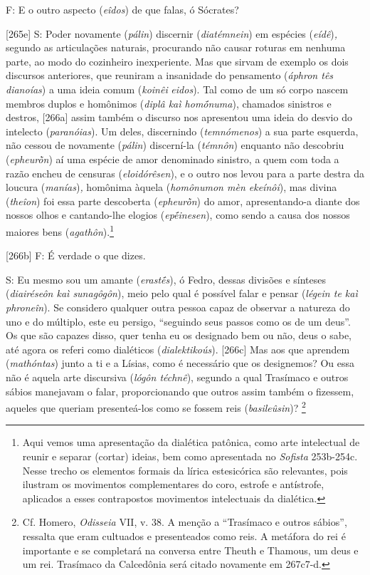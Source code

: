 F: E o outro aspecto (\emph{eîdos}) de que falas, ó Sócrates?

{[}265e{]} S: Poder novamente (\emph{pálin}) discernir
(\emph{diatémnein}) em espécies (\emph{eídê})\emph{,} segundo as
articulações naturais, procurando não causar roturas em nenhuma parte,
ao modo do cozinheiro inexperiente. Mas que sirvam de exemplo os dois
discursos anteriores, que reuniram a insanidade do pensamento
(\emph{áphron tês dianoías}) a uma ideia comum (\emph{koinêi}
\emph{eidos}). Tal como de um só corpo nascem membros duplos e homônimos
(\emph{diplâ kaì homṓnuma}), chamados sinistros e destros, {[}266a{]}
assim também o discurso nos apresentou uma ideia do desvio do intelecto
(\emph{paranóias}). Um deles, discernindo (\emph{temnómenos}) a sua
parte esquerda, não cessou de novamente (\emph{pálin}) discerní-la
(\emph{témnôn}) enquanto não descobriu (\emph{epheurṑn}) aí uma espécie
de amor denominado sinistro, a quem com toda a razão encheu de censuras
(\emph{eloidórêsen}), e o outro nos levou para a parte destra da loucura
(\emph{manías})\emph{,} homônima àquela (\emph{homônumon mèn ekeínôi}),
mas divina (\emph{theîon}) foi essa parte descoberta (\emph{epheurṑn})
do amor, apresentando-a diante dos nossos olhos e cantando-lhe elogios
(\emph{epḗinesen}), como sendo a causa dos nossos maiores bens
(\emph{agathôn}).\footnote{Aqui vemos uma apresentação da dialética
  patônica, como arte intelectual de reunir e separar (cortar) ideias,
  bem como apresentada no \emph{Sofista} 253b-254c. Nesse trecho os
  elementos formais da lírica estesicórica são relevantes, pois ilustram
  os movimentos complementares do coro, estrofe e antístrofe, aplicados
  a esses contrapostos movimentos intelectuais da dialética.}

{[}266b{]} F: É verdade o que dizes.

S: Eu mesmo sou um amante (\emph{erastḗs}), ó Fedro, dessas divisões e
sínteses (\emph{diairéseôn kaì sunagôgôn}), meio pelo qual é possível
falar e pensar (\emph{légein te kaì phroneîn}). Se considero qualquer
outra pessoa capaz de observar a natureza do uno e do múltiplo, este eu
persigo, ``seguindo seus passos como os de um deus''. Os que são capazes
disso, quer tenha eu os designado bem ou não, deus o sabe, até agora os
referi como dialéticos (\emph{dialektikoús}). {[}266c{]} Mas aos que
aprendem (\emph{mathóntas}) junto a ti e a Lísias, como é necessário que
os designemos? Ou essa não é aquela arte discursiva (\emph{lógôn
téchnê}), segundo a qual Trasímaco e outros sábios manejavam o falar,
proporcionando que outros assim também o fizessem, aqueles que queriam
presenteá-los como se fossem reis (\emph{basileûsin})? \footnote{Cf.
  Homero, \emph{Odisseia} VII, v. 38. A menção a ``Trasímaco e outros
  sábios'', ressalta que eram cultuados e presenteados como reis. A
  metáfora do rei é importante e se completará na conversa entre Theuth
  e Thamous, um deus e um rei. Trasímaco da Calcedônia será citado
  novamente em 267c7-d.}

